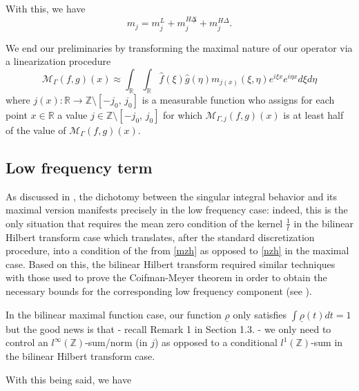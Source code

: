 \documentclass{amsart}
\newcommand{\R}{\mathbb{R}}
\newcommand{\Z}{\mathbb{Z}}
\newcommand{\M}{\mathcal{M}}
\theoremstyle{definition}
\theoremstyle{remark}
\numberwithin{equation}{section}
\begin{document}
With this, we have
\begin{equation}\label{multiplier}
 m_j=m_j^L+m_j^{H\not\Delta}+m_j^{H\Delta}.
\end{equation}

We end our preliminaries by transforming the maximal nature of our operator via a linearization procedure
\begin{equation}\label{multiplier1}
  \M_\Gamma(f,g)(x)\approx\int_\R\int_\R \hat{f}(\xi)\hat{g}(\eta)m_{j(x)}(\xi,\eta)e^{i\xi x}e^{i\eta x}d\xi d\eta
\end{equation}
where $j(x):\R\to\Z\setminus [-j_0,\,j_0]$ is a measurable function who assigns for each point $x\in\R$ a value $j\in \Z\setminus [-j_0,\,j_0]$ for which $\M_{\Gamma,j}(f,g)(x)$ is at least half of the value of $\M_\Gamma(f,g)(x)$.



\subsection{Low frequency term}\label{low_frequency-subsection}
As discussed in \cite{lie2019unifiedap}, the dichotomy between the singular integral behavior and its maximal version manifests precisely in the low frequency case: indeed, this is the only situation that requires the mean zero condition of the kernel $\frac{1}{t}$ in the bilinear Hilbert transform case which translates, after the standard discretization procedure, into a condition of the from \eqref{mzh} as opposed to \eqref{nzh} in the maximal case. Based on this, the bilinear Hilbert transform required similar techniques with those used to prove the Coifman-Meyer theorem in order to obtain the necessary bounds for the corresponding low frequency component (see \cite[Theorem 1]{lie2015boundedness}).

In the bilinear maximal function case, our function $\underline{\rho}$ only satisfies $\int\underline{\rho}(t)dt=1$ but the good news is that - recall Remark 1 in Section 1.3. -  we only need to control an $l^{\infty}(\Z)$-sum/norm (in $j$) as opposed to a conditional $l^1(\Z)$-sum in the bilinear Hilbert transform case.

With this being said, we have
\end{document}
